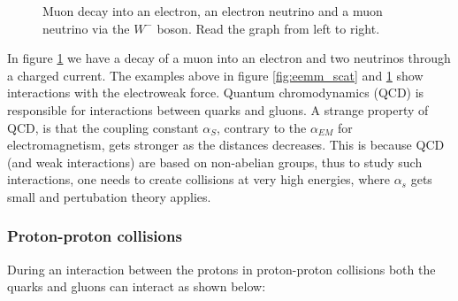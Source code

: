 \begin{figure}[h!]
    \centering
    
    \caption[Muon decay diagram]{Muon decay into an electron, an electron neutrino and a muon neutrino via the $W^{-}$ boson. Read the graph from left to right.}
    \label{fig:mw_decay}
\end{figure}

In figure \ref{fig:mw_decay} we have a decay of a muon into an electron and two neutrinos through a charged current. 
The examples above in figure \ref{fig:eemm_scat} and \ref{fig:mw_decay} show interactions with 
the electroweak force. Quantum chromodynamics (QCD) is 
responsible for interactions between quarks and gluons. A strange property of QCD,
is that the coupling constant $\alpha_{S}$, contrary to the $\alpha_{EM}$ for electromagnetism,
gets stronger as the distances decreases. This is because QCD (and weak interactions) are based on non-abelian 
groups\cite{Peskin:1995ev}, thus to study such interactions, one needs to create collisions at very high energies, 
where $\alpha_s$ gets small and pertubation theory applies.

\subsubsection*{Proton-proton collisions}
During an interaction between the protons in proton-proton collisions both the quarks and gluons
can interact as shown below:

